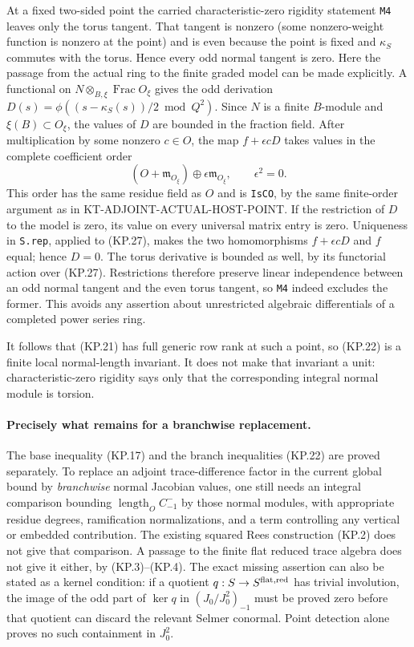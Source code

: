 At a fixed two-sided point the carried characteristic-zero
rigidity statement \texttt{M4} leaves only the torus tangent.
That tangent is nonzero (some nonzero-weight function is
nonzero at the point) and is even because the point is fixed
and $\kappa_S$ commutes with the torus.  Hence every odd
normal tangent is zero.  Here the passage from the actual
ring to the finite graded model can be made explicitly.
A functional on $N\otimes_{B,\xi}\operatorname{Frac}O_\xi$
gives the odd derivation
$D(s)=\phi((s-\kappa_S(s))/2\bmod Q^2)$.
Since $N$ is a finite $B$-module and $\xi(B)\subset O_\xi$,
the values of $D$ are bounded in the fraction field.
After multiplication by some nonzero $c\in O$, the map
$f+\epsilon cD$ takes values in the complete coefficient
order
\[
 (O+\mathfrak m_{O_\xi})\oplus
                  \epsilon\mathfrak m_{O_\xi},\qquad\epsilon^2=0.
                                                                  \tag{KP.27}
\]
This order has the same residue field as $O$ and is
\texttt{IsCO}, by the same finite-order argument as in
KT-ADJOINT-ACTUAL-HOST-POINT.  If the restriction of $D$
to the model is zero, its value on every universal matrix
entry is zero.  Uniqueness in \texttt{S.rep}, applied to
(KP.27), makes the two homomorphisms $f+\epsilon cD$ and
$f$ equal; hence $D=0$.  The torus derivative is bounded
as well, by its functorial action over (KP.27).  Restrictions
therefore preserve linear independence between an odd
normal tangent and the even torus tangent, so \texttt{M4}
indeed excludes the former.  This avoids any assertion
about unrestricted algebraic differentials of a completed
power series ring.

It follows that (KP.21) has full generic row rank at such
a point, so (KP.22) is a finite local normal-length
invariant.  It does not make that invariant a unit:
characteristic-zero rigidity says only that the
corresponding integral normal module is torsion.

\paragraph{Precisely what remains for a branchwise replacement.}
The base inequality (KP.17) and the branch inequalities
(KP.22) are proved separately.  To replace an adjoint
trace-difference factor in the current global bound by
\emph{branchwise} normal Jacobian values, one still needs
an integral comparison bounding
$\operatorname{length}_O C^-_{-1}$ by those normal modules,
with appropriate residue degrees, ramification normalizations,
and a term controlling any vertical or embedded contribution.
The existing squared Rees construction (KP.2) does not give
that comparison.  A passage to the finite flat reduced
trace algebra does not give it either, by (KP.3)--(KP.4).
The exact missing assertion can also be stated as a kernel
condition: if a quotient $q:S\to S^{\rm flat,red}$ has trivial
involution, the image of the odd part of $\ker q$ in
$(J_0/J_0^2)_{-1}$ must be proved zero before that quotient
can discard the relevant Selmer conormal.  Point detection
alone proves no such containment in $J_0^2$.

